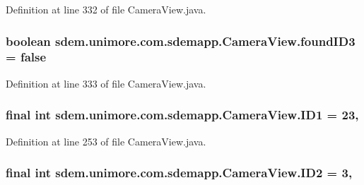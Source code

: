 Definition at line 332 of file Camera\+View.\+java.

\hypertarget{classsdem_1_1unimore_1_1com_1_1sdemapp_1_1_camera_view_ac34c35419c994bb836d0920611bfd614}{
\subsubsection[{found\+I\+D3}]{\setlength{\rightskip}{0pt plus 5cm}boolean sdem.\+unimore.\+com.\+sdemapp.\+Camera\+View.\+found\+I\+D3 = false\hspace{0.3cm}{\ttfamily [private]}}}\label{classsdem_1_1unimore_1_1com_1_1sdemapp_1_1_camera_view_ac34c35419c994bb836d0920611bfd614}


Definition at line 333 of file Camera\+View.\+java.

\hypertarget{classsdem_1_1unimore_1_1com_1_1sdemapp_1_1_camera_view_a72f57aecb1908f9b3602c0cfd5a08f16}{
\subsubsection[{I\+D1}]{\setlength{\rightskip}{0pt plus 5cm}final int sdem.\+unimore.\+com.\+sdemapp.\+Camera\+View.\+I\+D1 = 23\hspace{0.3cm}{\ttfamily [static]}, {\ttfamily [private]}}}\label{classsdem_1_1unimore_1_1com_1_1sdemapp_1_1_camera_view_a72f57aecb1908f9b3602c0cfd5a08f16}


Definition at line 253 of file Camera\+View.\+java.

\hypertarget{classsdem_1_1unimore_1_1com_1_1sdemapp_1_1_camera_view_a3c4253e5d83076aebfc830494b70f1a1}{
\subsubsection[{I\+D2}]{\setlength{\rightskip}{0pt plus 5cm}final int sdem.\+unimore.\+com.\+sdemapp.\+Camera\+View.\+I\+D2 = 3\hspace{0.3cm}{\ttfamily [static]}, {\ttfamily [private]}}}\label{classsdem_1_1unimore_1_1com_1_1sdemapp_1_1_camera_view_a3c4253e5d83076aebfc830494b70f1a1}


